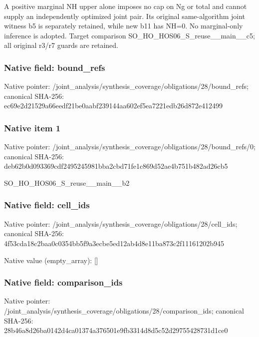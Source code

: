 \documentclass[10pt,a4paper]{article}
\begin{document}
\begingroup\raggedright\sloppy A positive marginal NH upper alone imposes no cap on Ng or total and cannot supply an independently optimized joint pair. Its original same-algorithm joint witness b5 is separately retained,\allowbreak{} while new b11 has NH=\allowbreak{}0. No marginal-only inference is adopted. Target comparison SO\_\allowbreak{}HO\_\allowbreak{}HOS06\_\allowbreak{}S\_\allowbreak{}reuse\_\allowbreak{}\_\allowbreak{}main\_\allowbreak{}\_\allowbreak{}c5;\allowbreak{} all original r3/\allowbreak{}r7 guards are retained.\par\endgroup

\subsubsection{Native field: bound\_\allowbreak{}refs}
Native pointer: /joint\_\allowbreak{}analysis/synthesis\_\allowbreak{}coverage/obligations/28/bound\_\allowbreak{}refs; canonical SHA-256: ec69e2d21529a66eedf21be0aabf239144aa602ef5ea7221edb26d872e412499

\subsubsection{Native item 1}
Native pointer: /joint\_\allowbreak{}analysis/synthesis\_\allowbreak{}coverage/obligations/28/bound\_\allowbreak{}refs/0; canonical SHA-256: deb62b0d093369cdf2495245981bba2cbd71fe1c869d52ae4b751b482ad26cb5

\begingroup\raggedright\sloppy SO\_\allowbreak{}HO\_\allowbreak{}HOS06\_\allowbreak{}S\_\allowbreak{}reuse\_\allowbreak{}\_\allowbreak{}main\_\allowbreak{}\_\allowbreak{}b2\par\endgroup

\subsubsection{Native field: cell\_\allowbreak{}ids}
Native pointer: /joint\_\allowbreak{}analysis/synthesis\_\allowbreak{}coverage/obligations/28/cell\_\allowbreak{}ids; canonical SHA-256: 4f53cda18c2baa0c0354bb5f9a3ecbe5ed12ab4d8e11ba873c2f11161202b945

Native value (empty\_\allowbreak{}array): []

\subsubsection{Native field: comparison\_\allowbreak{}ids}
Native pointer: /joint\_\allowbreak{}analysis/synthesis\_\allowbreak{}coverage/obligations/28/comparison\_\allowbreak{}ids; canonical SHA-256: 28b46a8d26ba0142d4ca01374a376501e9fb3314d8d5c52d29755428731d1ce0
\end{document}
